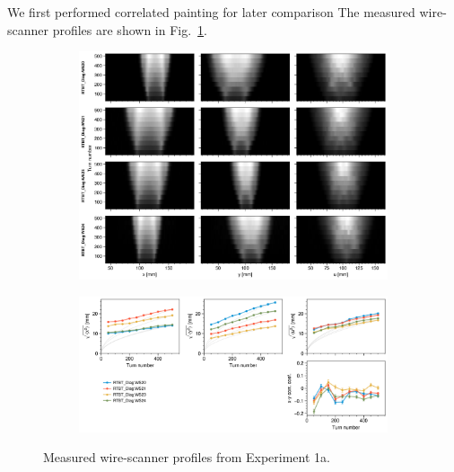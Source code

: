 We first performed correlated painting for later comparison The measured wire-scanner profiles are shown in Fig.~\ref{fig:exp1a_wsmeas}.
%
\begin{figure}[!p]
    \centering
    \begin{subfigure}{\textwidth}
        \includegraphics[width=\textwidth]{Images/chapter5/exp1a/waterfall.png}
    \end{subfigure}
    \vfill
    \vspace*{1.25cm}
    \vfill
    \begin{subfigure}{\textwidth}
        \includegraphics[width=\textwidth]{Images/chapter5/exp1a/rms.png}
    \end{subfigure}
    \caption{Measured wire-scanner profiles from Experiment 1a.}
    \label{fig:exp1a_wsmeas}
\end{figure}
%
%

